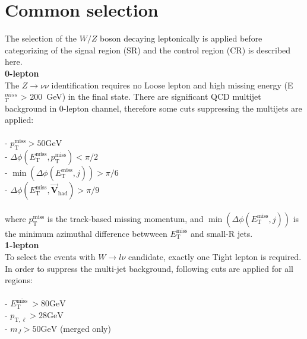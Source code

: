 \section{Common selection}
The selection of the $W/Z$ boson decaying leptonically is applied before categorizing of the signal region (SR) and the control region (CR) is described here.　\\
\noindent \textbf{0-lepton}\\
The $Z \rightarrow \nu\nu$ identification requires no Loose lepton and high missing energy (E$_T^{miss}$ > 200~GeV) in the final state. There are significant QCD multijet background in 0-lepton channel, therefore some cuts suppressing the multijets are applied: \\
\\
- $p_{\mathrm{T}}^{\mathrm{miss}}>50 \mathrm{GeV}$ \\
- $\Delta \phi\left(E_{\mathrm{T}}^{\mathrm{miss}}, p_{\mathrm{T}}^{\mathrm{miss}}\right)<\pi / 2$ \\
- $\min \left(\Delta \phi\left(E_{\mathrm{T}}^{\mathrm{miss}}, j\right)\right)>\pi / 6$ \\
- $\Delta \phi\left(E_{\mathrm{T}}^{\mathrm{miss}}, \overrightarrow{\mathbf{V}}_{\mathrm{had}}\right)>\pi / 9$ \\ \\
where $p_{\mathrm{T}}^{\mathrm{miss}}$ is the track-based missing momentum, and $\min \left(\Delta \phi\left(E_{\mathrm{T}}^{\mathrm{miss}}, j\right)\right)$ is the minimum azimuthal difference betwween $E_{\mathrm{T}}^{\mathrm{miss}}$ and small-R jets. \\

\noindent\textbf{1-lepton} \\
To select the events with $W \rightarrow l\nu$ candidate, exactly one Tight lepton is required.
In order to suppress the multi-jet background, following cuts are applied for all regions: \\ \\
- $E_{\mathrm{T}}^{\text {miss }}>80 \mathrm{GeV}$ \\ 
- $p_{\mathrm{T}, \ell}>28 \mathrm{GeV}$ \\
- $m_{J}>50 \mathrm{GeV}$ (merged only) \\ \\

